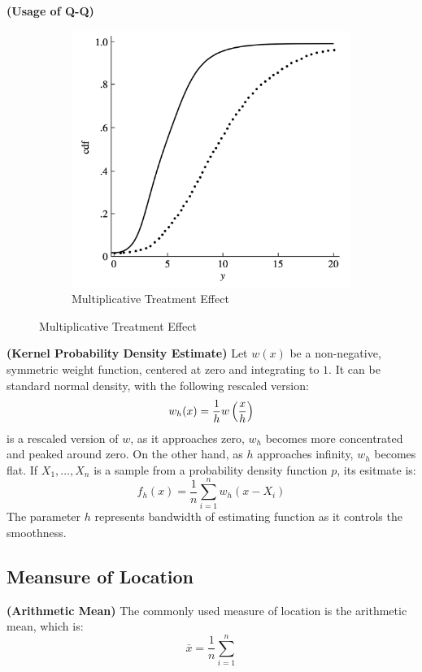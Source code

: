 \begin{remark}{\textbf{(Usage of Q-Q)}}
\begin{figure}[H]
\begin{subfigure}{.5\textwidth}
        \includegraphics[width=0.7\linewidth]{img/img4.png}
        \caption{Multiplicative Treatment Effect}
        \label{fig:1-sub2}
    \end{subfigure}
    \end{figure}
\end{remark}

\begin{definition}{\textbf{(Kernel Probability Density Estimate)}}
    Let $w(x)$ be a non-negative, symmetric weight function, centered at zero and integrating to $1$. It can be standard normal density, with the following rescaled version:
    \begin{equation*}
        w_h(x) = \frac{1}{h}w\left( \frac{x}{h} \right)
    \end{equation*}
    is a rescaled version of $w$, as it approaches zero, $w_h$ becomes more concentrated and peaked around zero. On the other hand, as $h$ approaches infinity, $w_h$ becomes flat. If $X_1,\dots,X_n$ is a sample from a probability density function $p$, its esitmate is:
    \begin{equation*}
        f_h(x) = \frac{1}{n}\sum^n_{i=1}w_h(x - X_i)
    \end{equation*}
    The parameter $h$ represents bandwidth of estimating function as it controls the smoothness.
\end{definition}

\subsection{Meansure of Location}

\begin{definition}{\textbf{(Arithmetic Mean)}}
    The commonly used measure of location is the arithmetic mean, which is:
    \begin{equation*}
        \bar{x} = \frac{1}{n}\sum^n_{i=1}
    \end{equation*}
\end{definition}

